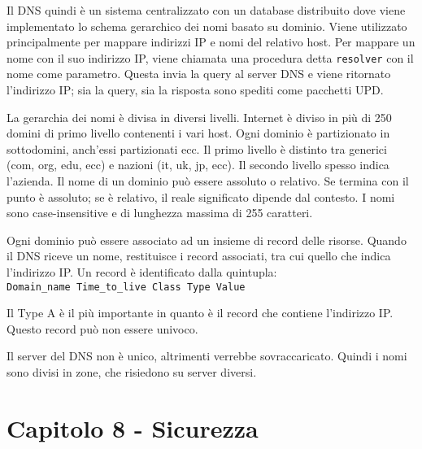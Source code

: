 Il DNS quindi è un sistema centralizzato con un database distribuito dove viene implementato lo schema gerarchico dei nomi basato su dominio. 
Viene utilizzato principalmente per mappare indirizzi IP e nomi del relativo host.
Per mappare un nome con il suo indirizzo IP, viene chiamata una procedura detta \texttt{resolver} con il nome come parametro.
Questa invia la query al server DNS e viene ritornato l'indirizzo IP; sia la query, sia la risposta sono spediti come pacchetti UPD.

La gerarchia dei nomi è divisa in diversi livelli. 
Internet è diviso in più di 250 domini di primo livello contenenti i vari host. 
Ogni dominio è partizionato in sottodomini, anch'essi partizionati ecc.
Il primo livello è distinto tra generici (com, org, edu, ecc) e nazioni (it, uk, jp, ecc).
Il secondo livello spesso indica l'azienda.
Il nome di un dominio può essere assoluto o relativo.
Se termina con il punto è assoluto; se è relativo, il reale significato dipende dal contesto.
I nomi sono case-insensitive e di lunghezza massima di 255 caratteri.

Ogni dominio può essere associato ad un insieme di record delle risorse.
Quando il DNS riceve un nome, restituisce i record associati, tra cui quello che indica l'indirizzo IP.
Un record è identificato dalla quintupla:\\
\texttt{Domain\_name Time\_to\_live Class Type Value}

Il Type A è il più importante in quanto è il record che contiene l'indirizzo IP. Questo record può non essere univoco.

Il server del DNS non è unico, altrimenti verrebbe sovraccaricato. Quindi i nomi sono divisi in zone, che risiedono su server diversi. 

\newpage
\section{Capitolo 8 - Sicurezza}












